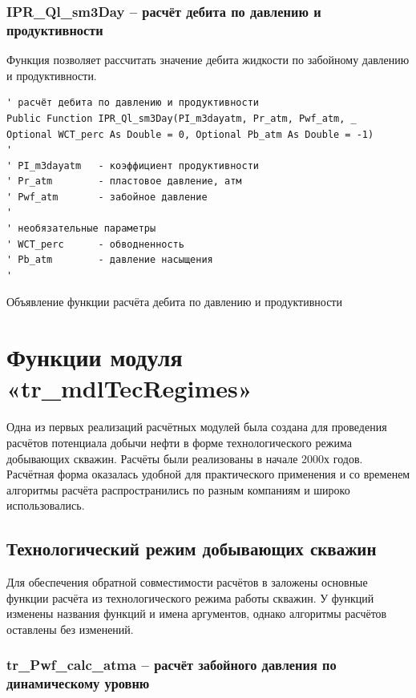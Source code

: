 \documentclass[]{scrreprt}
\begin{document}
\subsection{IPR\_Ql\_sm3Day – расчёт дебита по давлению и продуктивности}
Функция позволяет рассчитать значение дебита жидкости по забойному давлению и продуктивности.
\begin{listing}[H]
	\begin{verbatim}
' расчёт дебита по давлению и продуктивности
Public Function IPR_Ql_sm3Day(PI_m3dayatm, Pr_atm, Pwf_atm, _
Optional WCT_perc As Double = 0, Optional Pb_atm As Double = -1)
'
' PI_m3dayatm   - коэффициент продуктивности
' Pr_atm        - пластовое давление, атм
' Pwf_atm       - забойное давление
'
' необязательные параметры
' WCT_perc      - обводненность
' Pb_atm        - давление насыщения
'

	\end{verbatim}
	\caption{Объявление функции расчёта дебита по давлению и продуктивности}
	\label{lst:codedIPR_Ql}
\end{listing}



\newpage
\chapter{Функции модуля  «tr\_mdlTecRegimes»}
Одна из первых реализаций расчётных модулей \unf была создана для проведения расчётов потенциала добычи нефти в форме технологического режима добывающих скважин. Расчёты были реализованы в начале 2000х годов. Расчётная форма оказалась удобной для практического применения и со временем алгоритмы расчёта распространились по разным компаниям и широко использовались.
\section{Технологический режим добывающих скважин}

 

Для обеспечения обратной совместимости расчётов в \unf заложены основные функции расчёта из технологического режима работы скважин. У функций изменены названия функций и имена аргументов, однако алгоритмы расчётов оставлены без изменений.

\newpage
\subsection{tr\_Pwf\_calc\_atma – расчёт забойного давления по динамическому уровню}
\end{document}
